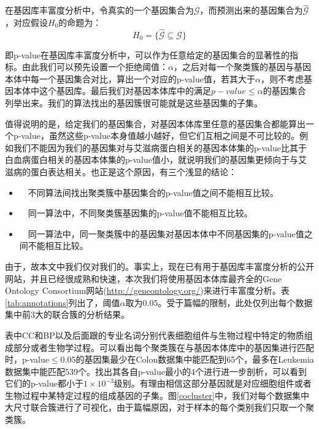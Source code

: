 \vspace{2mm}
在基因库丰富度分析中，令真实的一个基因集合为$\mathcal{G}$，而预测出来的基因集合为$\hat{\mathcal{G}}$，对应假设$H_0$的命题为：
\begin{equation*}
H_0 = \{\hat{\mathcal{G}}\subseteq{}\mathcal{G}\}
\end{equation*}

即p-value在基因库丰富度分析中，可以作为任意给定的基因集合的显著性的指标。由此我们可以预先设置一个拒绝阈值：$\alpha$，之后对每一个聚类簇的基因与基因本体中每一个基因集合对比，算出一个对应的p-value值，若其大于$\alpha$，则不考虑基因本体中这个基因库。最后我们对基因本体库中的满足$p-value\leq\alpha$的基因集合列举出来。我们的算法找出的基因簇很可能就是这些基因集的子集。

值得说明的是，给定我们的基因集合，对基因本体库里任意的基因集合都能算出一个p-value，虽然这些p-value本身值越小越好，但它们互相之间是不可比较的。例如我们不能因为我们的基因集对与艾滋病蛋白相关的基因本体集的p-value比其于白血病蛋白相关的基因本体集的p-value值小，就说明我们的基因集更倾向于与艾滋病的蛋白表达相关。也正是这个原因，有三个浅显的结论：
\begin{itemize}
\item ~~不同算法间找出聚类簇中基因集合的p-value值之间不能相互比较。
\item ~~同一算法中，不同聚类簇基因集的p-value值不能相互比较。
\item ~~同一算法中，同一聚类簇中的基因集对基因本体中不同基因集的p-value值之间不能相互比较。
\end{itemize}

由于，故本文中我们仅对我们的。事实上，现在已有用于基因库丰富度分析的公开网站，并且已经很成熟和快速，本次我们将使用基因本体库最齐全的Gene Ontology Consortium网站(\url{http://geneontology.org/})来进行丰富度分析。表\ref{tab:annotations}列出了，阈值$\alpha$取为$0.05$。受于篇幅的限制，此处仅列出每个数据集中前3大的联合簇的分析结果。

表中CC和BP以及后面跟的专业名词分别代表细胞组件与生物过程中特定的物质组成部分或者生物学过程。可以看出每个聚类簇在与基因本体库中的基因集进行匹配时，p-value$\le0.05$的基因集最少在Colon数据集中能匹配到65个，最多在Leukemia数据集中能匹配539个。找出其各自p-value最小的4个进行进一步剖析，可以看到它们的p-value都小于$1\times10^{-3}$级别。有理由相信这部分基因就是对应细胞组件或者生物过程中某特定过程的组成基因的子集。图\ref{cocluster}中，我们对每个数据集中大尺寸联合簇进行了可视化，由于篇幅原因，对于样本的每个类别我们只取一个聚类簇。

